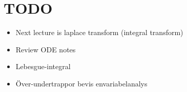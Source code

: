 \section{TODO}\par
\begin{itemize}
  \item Next lecture is laplace transform (integral transform) 
  \item Review ODE notes
  \item Lebesgue-integral
  \item Över-undertrappor bevis envariabelanalys
\end{itemize}
